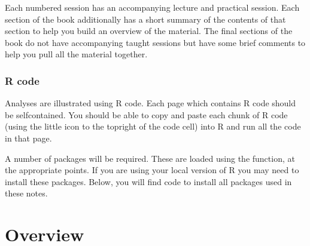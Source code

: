 \documentclass[letterpaper,10pt,english]{jupyterBook}
\begin{document}
\sphinxAtStartPar
Each numbered session has an accompanying lecture and practical session. Each section of the book additionally has a short summary of the contents of that section to help you build an overview of the material. The final sections of the book do not have accompanying taught sessions but have some brief comments to help you pull all the material together.


\section{R code}
\label{\detokenize{00. How_to_use:r-code}}
\sphinxAtStartPar
Analyses are illustrated using R code. Each page which contains R code should be self\sphinxhyphen{}contained. You should be able to copy and paste each chunk of R code (using the little icon to the top\sphinxhyphen{}right of the code cell) into R and run all the code in that page.

\sphinxAtStartPar
A number of packages will be required. These are loaded using the  function, at the appropriate points. If you are using your local version of R you may need to install these packages. Below, you will find code to install all packages used in these notes.

\begin{sphinxVerbatim}[commandchars=\\\{\}]



\end{sphinxVerbatim}


\part{Overview}
\end{document}
